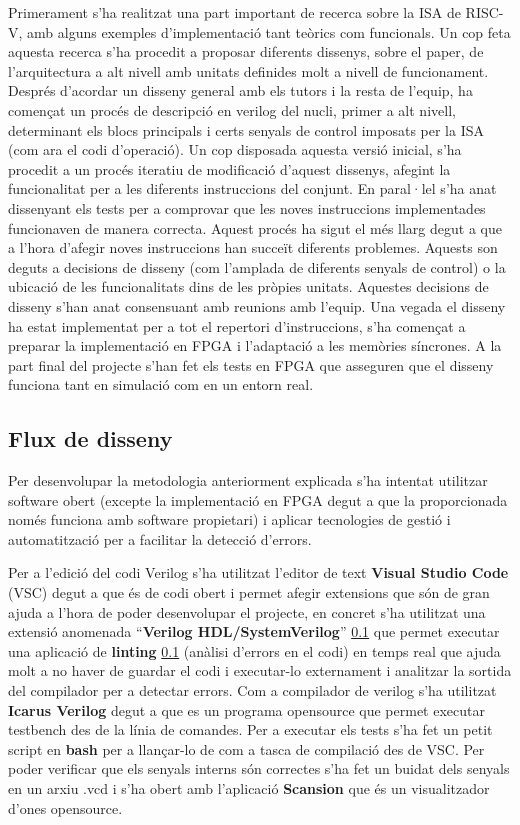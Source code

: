 \documentclass[10pt,a4paper,twocolumn,twoside]{article}
\begin{document}
Primerament s'ha realitzat una part important de recerca sobre la ISA de RISC-V, amb alguns exemples d'implementació tant teòrics com funcionals. 
Un cop feta aquesta recerca s'ha procedit a proposar diferents dissenys, sobre el paper, de l'arquitectura a alt nivell amb unitats definides molt a nivell de funcionament. 
Després d'acordar un disseny general amb els tutors i la resta de l'equip, ha començat un procés de descripció en verilog del nucli, primer a alt nivell, determinant els blocs principals i certs senyals de control imposats per la ISA (com ara el codi d'operació). 
Un cop disposada aquesta versió inicial, s'ha procedit a un procés iteratiu de modificació d'aquest dissenys, afegint la funcionalitat per a les diferents instruccions del conjunt. En paral·lel s'ha anat dissenyant els tests per a comprovar que les noves instruccions implementades funcionaven de manera correcta. 
Aquest procés ha sigut el més llarg degut a que a l'hora d'afegir noves instruccions han succeït diferents problemes. Aquests son deguts a decisions de disseny (com l'amplada de diferents senyals de control) o la ubicació de les funcionalitats dins de les pròpies unitats. 
Aquestes decisions de disseny s’han anat consensuant amb reunions amb  l'equip. 
Una vegada el disseny ha estat implementat per a tot el repertori d'instruccions, s'ha començat a preparar la implementació en FPGA i l'adaptació a les memòries síncrones. A la part final del projecte s'han fet els tests en FPGA que asseguren que el disseny funciona tant en simulació com en un entorn real.


\subsection{Flux de disseny}  %
Per desenvolupar la metodologia anteriorment explicada s'ha intentat utilitzar software obert (excepte la implementació en FPGA degut a que la proporcionada només funciona amb software propietari) i aplicar tecnologies de gestió i automatització per a facilitar la detecció d'errors. 

Per a l'edició del codi Verilog s'ha utilitzat l'editor de text \textbf{Visual Studio Code} (VSC) degut a que és de codi obert i permet afegir extensions que són de gran ajuda a l'hora de poder desenvolupar el projecte, en concret s'ha utilitzat una extensió anomenada ``\textbf{Verilog HDL/SystemVerilog}'' \ref{} que permet executar una aplicació de \textbf{linting} \ref{} (anàlisi d'errors en el codi) en temps real que ajuda molt a no haver de guardar el codi i executar-lo externament i analitzar la sortida del compilador per a detectar errors. Com a compilador de verilog s'ha utilitzat \textbf{Icarus Verilog} degut a que es un programa opensource que permet executar testbench des de la línia de comandes. Per a executar els tests s'ha fet un petit script en \textbf{bash} per a llançar-lo de com a tasca de compilació des de VSC. Per poder verificar que els senyals interns són correctes s'ha fet un buidat dels senyals en un arxiu .vcd i s'ha obert amb l'aplicació \textbf{Scansion} que és un visualitzador d'ones opensource.
\end{document}
